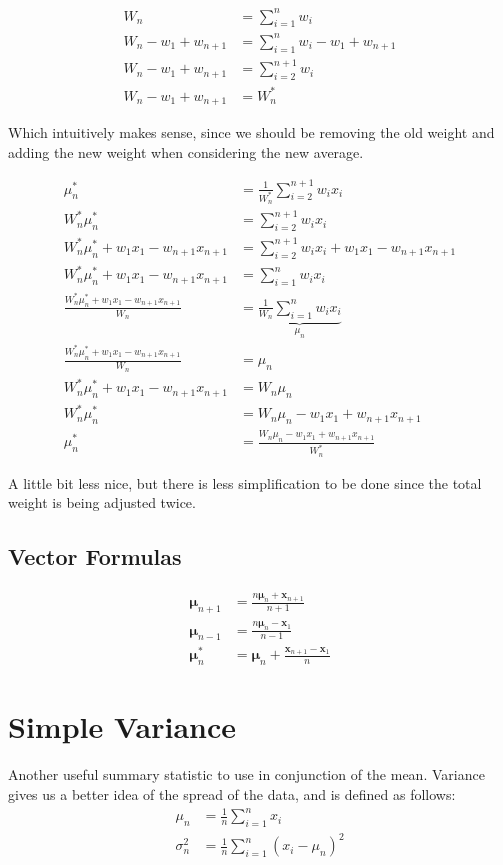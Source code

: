 \documentclass[english,12pt]{article}
\theoremstyle{plain}
\theoremstyle{definition}
\theoremstyle{definition} %
\begin{document}
\begin{align*}
W_n &= \sum_{i=1}^n w_i\\
W_n - w_1 + w_{n+1} &= \sum_{i=1}^n w_i - w_1 + w_{n+1}\\
W_n - w_1 + w_{n+1} &= \sum_{i=2}^{n+1} w_i\\
W_n - w_1 + w_{n+1} &= W_n^\ast
\end{align*}

Which intuitively makes sense, since we should be removing the old weight and adding the new weight when considering the new average.

\begin{align*}
\mu_n^\ast &= \frac{1}{W_n^\ast}\sum_{i=2}^{n+1}w_ix_i\\
W_n^\ast\mu_n^\ast &=\sum_{i=2}^{n+1}w_ix_i\\
W_n^\ast\mu_n^\ast + w_1x_1 - w_{n+1}x_{n+1} &=\sum_{i=2}^{n+1}w_ix_i + w_1x_1 - w_{n+1}x_{n+1}\\
W_n^\ast\mu_n^\ast + w_1x_1 - w_{n+1}x_{n+1} &=\sum_{i=1}^nw_ix_i\\
\frac{W_n^\ast\mu_n^\ast + w_1x_1 - w_{n+1}x_{n+1}}{W_n} &=\underbrace{\frac{1}{W_n}\sum_{i=1}^nw_ix_i}_{\mu_n}\\
\frac{W_n^\ast\mu_n^\ast + w_1x_1 - w_{n+1}x_{n+1}}{W_n} &=\mu_n\\
W_n^\ast\mu_n^\ast + w_1x_1 - w_{n+1}x_{n+1} &=W_n\mu_n\\
W_n^\ast\mu_n^\ast  &=W_n\mu_n - w_1x_1 + w_{n+1}x_{n+1}\\
\mu_n^\ast  &= \frac{W_n\mu_n - w_1x_1 + w_{n+1}x_{n+1}}{W_n^\ast}
\end{align*}

A little bit less nice, but there is less simplification to be done since the total weight is being adjusted twice.

\subsection{Vector Formulas}
\begin{align*}
\boldsymbol{\mu}_{n + 1} &= \frac{n\boldsymbol{\mu}_n + \mathbf{x}_{n+1}}{n + 1}\\
\boldsymbol{\mu}_{n - 1} &= \frac{n\boldsymbol{\mu}_n - \mathbf{x}_1}{n-1}\\
\boldsymbol{\mu}_n^\ast &= \boldsymbol{\mu}_n + \frac{\mathbf{x}_{n+1} - \mathbf{x}_{1}}{n}
\end{align*}

\section{Simple Variance}
Another useful summary statistic to use in conjunction of the mean.  Variance gives us a better idea of the spread of the data, and is defined as follows:
\begin{align*}
\mu_n &=\frac{1}{n}\sum_{i=1}^n x_i\\
\sigma_n^2 &= \frac{1}{n}\sum_{i=1}^n (x_i - \mu_n)^2
\end{align*}
\end{document}
